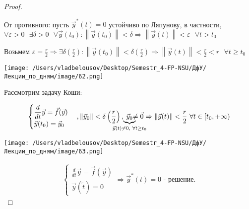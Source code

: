 \documentclass[12pt, a4paper]{report}
\begin{document}
\begin{proof} \(  \) 

    От противного: пусть \( \vec{y } ^* (t)  = 0 \) устойчиво по Ляпунову, в частности, \( \forall  \varepsilon > 0 \text{ }  \exists  \delta > 0  \text{ }  \forall  \vec{y } (t_0 ) : \left\lVert  \vec{y}  (t_0 ) \right\rVert < \delta \Rightarrow \left\lVert \vec{y}  (t) \right\rVert < \varepsilon \text{ } \forall  t > t_0 \) 

    Возьмем \( \displaystyle  \varepsilon = \frac{r}{2 }  \Rightarrow \exists  \delta \left( \frac{r}{2 }    \right) : \left\lVert \vec{y} (t_0 ) \right\rVert < \delta \left( \frac{r}{2}  \right) \Rightarrow \left\lVert \vec{y} (t ) \right\rVert < \frac{r}{2 }  <r  \text{ }  \forall  t \ge  t_0 \) 

    \begin{center}
        \texttt{[image: /Users/vladbelousov/Desktop/Semestr\_4-FP-NSU/ДфУ/Лекции\_по\_дням/image/62.png]}
    \end{center}

    Рассмотрим задачу Коши: 

    \[\begin{aligned}
        \begin{cases}
            \displaystyle \frac{d}{dt } \vec{y}  = \vec{f } (\vec{y} ) \\
            \vec{y } (t_0) = \vec{y } _0
        \end{cases} 
        , \left\lVert \vec{y}  _0 \right\rVert < \delta \left( \frac{r}{2 }  \right) , \text{ }  \kern-0.8cm\underbrace{\vec{y } _0}_{\vec{y}  (t ) \neq 0 ,\text{ }  \forall  t \ge  t_0} \kern-0.8cm \neq \vec{0} \Rightarrow  \left\lVert \vec{ y } (t ) \right\rVert < \frac{r}{2 }  \text{ }  \forall  t \in  [ t_0 , + \infty ) 
    \end{aligned}\] 

    \begin{center}
        \texttt{[image: /Users/vladbelousov/Desktop/Semestr\_4-FP-NSU/ДфУ/Лекции\_по\_дням/image/63.png]}
    \end{center}

    \[ \begin{aligned}
    \begin{cases}
    \displaystyle  \frac{d}{dt }  \vec{y}  = \vec{f } (\vec{y} ) \\ 
    \vec{y } (\tilde{t } ) = 0
    \end{cases}
    \Rightarrow \vec{y } ^* (t ) = 0 \text{ - решение.} 
    \end{aligned} \] 



\end{proof}
\end{document}
